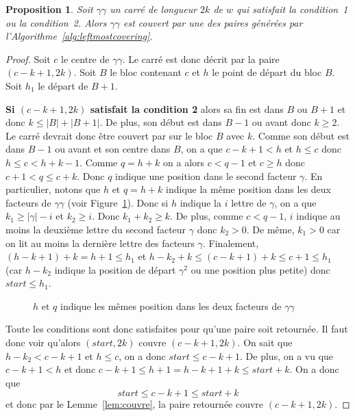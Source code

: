 \documentclass[10pt,letterpaper,oneside]{article}
\newtheorem{proposition}{Proposition}
\begin{document}
\begin{proposition} \label{prop:couvre}
    Soit $\gamma\gamma$ un carré de longueur $2k$ de $w$ qui satisfait la condition~1 ou la condition~2. Alors $\gamma\gamma$ est couvert par une des paires générées par l'Algorithme~\ref{alg:leftmostcovering}.
\end{proposition}

\begin{proof}
    Soit $c$ le centre de $\gamma\gamma$. Le carré est donc décrit par la paire $(c-k+1,2k)$. Soit $B$ le bloc contenant $c$ et $h$ le point de départ du bloc $B$. Soit $h_1$ le départ de $B+1$.
    
    \textbf{Si $(c-k+1,2k)$ satisfait la condition 2} alors sa fin est dans $B$ ou $B+1$ et donc $k\leq |B|+|B+1|$. De plus, son début est dans $B-1$ ou avant donc $k\geq 2$. Le carré devrait donc être couvert par  sur le bloc $B$ avec $k$.  Comme son début est dans $B-1$ ou avant et son centre dans $B$, on a que $c-k+1<h$ et $h\leq c$ donc $h\leq c<h+k-1$. Comme $q=h+k$ on a alors $c<q-1$ et $c\geq h$ donc $c+1<q\leq c+k$. Donc $q$ indique une position dans le second facteur $\gamma$. En particulier, notons que $h$ et $q=h+k$ indique la même position dans les deux facteurs de $\gamma\gamma$ (voir Figure~\ref{fig:gammab}). Donc si $h$ indique la $i$ lettre de $\gamma$, on a que $k_1\geq |\gamma|-i$ et $k_2\geq i$. Donc $k_1+k_2\geq k$. De plus, comme $c<q-1$, $i$ indique au moins la deuxième lettre du second facteur $\gamma$ donc $k_2>0$. De même, $k_1>0$ car on lit au moins la dernière lettre des facteurs $\gamma$. Finalement, $(h-k+1)+k=h+1\leq h_1$ et $h-k_2+k\leq (c-k+1)+k \leq c+1 \leq h_1$ (car $h-k_2$ indique la position de départ $\gamma^2$ ou une position plus petite) donc $start\leq h_1$.
    \begin{figure}[htb]
        \centering
        
        \caption{$h$ et $q$ indique les mêmes position dans les deux facteurs de $\gamma\gamma$} \label{fig:gammab}
    \end{figure}
    
    Toute les conditions sont donc satisfaites pour qu'une paire soit retournée. Il faut donc voir qu'alors $(start,2k)$ couvre $(c-k+1,2k)$. On sait que $h-k_2<c-k+1$ et $h\leq c$, on a donc $start\leq c-k+1$. De plus, on a vu que $c-k+1<h$ et donc $c-k+1\leq h+1 = h-k+1+k\leq start+k$. On a donc que
    $$start\leq c-k+1\leq start+k$$
    et donc par le Lemme~\ref{lem:couvre}, la paire retournée couvre $(c-k+1,2k)$.
    

\end{proof}
\end{document}
